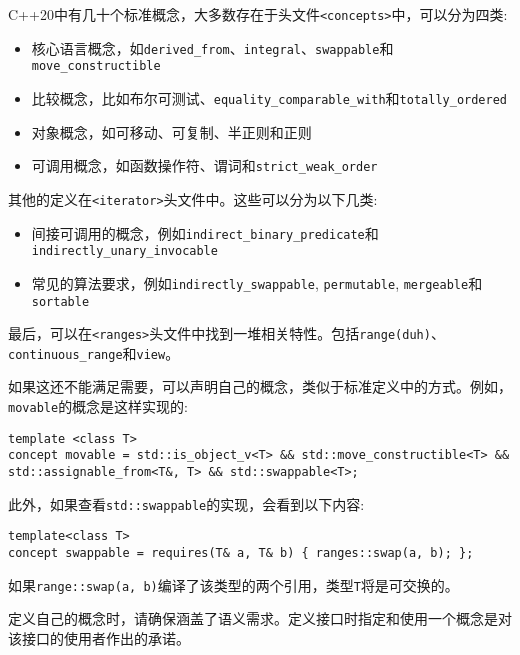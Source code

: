 C++20中有几十个标准概念，大多数存在于头文件\texttt{<concepts>}中，可以分为四类:

\begin{itemize}
\item 
核心语言概念，如\texttt{derived\_from}、\texttt{integral}、\texttt{swappable}和\texttt{move\_constructible}

\item 
比较概念，比如布尔可测试、\texttt{equality\_comparable\_with}和\texttt{totally\_ordered}

\item 
对象概念，如可移动、可复制、半正则和正则

\item 
可调用概念，如函数操作符、谓词和\texttt{strict\_weak\_order}
\end{itemize}

其他的定义在\texttt{<iterator>}头文件中。这些可以分为以下几类:

\begin{itemize}
\item 
间接可调用的概念，例如\texttt{indirect\_binary\_predicate}和\texttt{indirectly\_unary\_invocable}

\item 
常见的算法要求，例如\texttt{indirectly\_swappable}, \texttt{permutable}, \texttt{mergeable}和\texttt{sortable}
\end{itemize}

最后，可以在\texttt{<ranges>}头文件中找到一堆相关特性。包括\texttt{range(duh)}、\texttt{continuous\_range}和\texttt{view}。

如果这还不能满足需要，可以声明自己的概念，类似于标准定义中的方式。例如，\texttt{movable}的概念是这样实现的:

\begin{lstlisting}[style=styleCXX]
template <class T>
concept movable = std::is_object_v<T> && std::move_constructible<T> &&
std::assignable_from<T&, T> && std::swappable<T>;
\end{lstlisting}

此外，如果查看\texttt{std::swappable}的实现，会看到以下内容:

\begin{lstlisting}[style=styleCXX]
template<class T>
concept swappable = requires(T& a, T& b) { ranges::swap(a, b); };
\end{lstlisting}

如果\texttt{range::swap(a, b)}编译了该类型的两个引用，类型\texttt{T}将是可交换的。

\begin{tcolorbox}[colback=webgreen!5!white,colframe=webgreen!75!black, title=TIP]
\hspace*{0.75cm}定义自己的概念时，请确保涵盖了语义需求。定义接口时指定和使用一个概念是对该接口的使用者作出的承诺。
\end{tcolorbox}

